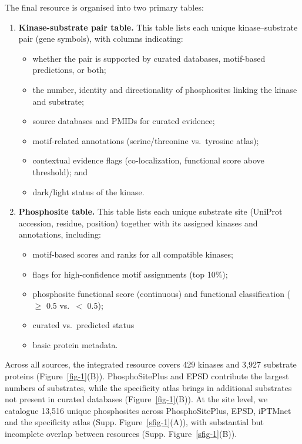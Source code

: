 \documentclass[
  number,
  preprint,
  onecolumn]{elsarticle}
\providecommand{\tightlist}{%
  \setlength{\itemsep}{0pt}\setlength{\parskip}{0pt}}
\begin{document}
The final resource is organised into two primary tables:

\begin{enumerate}
\def\labelenumi{\arabic{enumi}.}
\tightlist
\item
  \textbf{Kinase-substrate pair table.} This table lists each unique
  kinase--substrate pair (gene symbols), with columns indicating:

  \begin{itemize}
  \tightlist
  \item
    whether the pair is supported by curated databases, motif-based
    predictions, or both;
  \item
    the number, identity and directionality of phosphosites linking the
    kinase and substrate;
  \item
    source databases and PMIDs for curated evidence;
  \item
    motif-related annotations (serine/threonine vs.~tyrosine atlas);
  \item
    contextual evidence flags (co-localization, functional score above
    threshold); and
  \item
    dark/light status of the kinase.
  \end{itemize}
\item
  \textbf{Phosphosite table.} This table lists each unique substrate
  site (UniProt accession, residue, position) together with its assigned
  kinases and annotations, including:

  \begin{itemize}
  \tightlist
  \item
    motif-based scores and ranks for all compatible kinases;
  \item
    flags for high-confidence motif assignments (top 10\%);
  \item
    phosphosite functional score (continuous) and functional
    classification (\(\ge\) 0.5 vs.~\(<\) 0.5);
  \item
    curated vs.~predicted status
  \item
    basic protein metadata.
  \end{itemize}
\end{enumerate}

Across all sources, the integrated resource covers 429 kinases and 3,927
substrate proteins (Figure~\ref{fig-1}(B)). PhosphoSitePlus and EPSD
contribute the largest numbers of substrates, while the specificity
atlas brings in additional substrates not present in curated databases
(Figure~\ref{fig-1}(B)). At the site level, we catalogue 13,516 unique
phosphosites across PhosphoSitePlus, EPSD, iPTMnet and the specificity
atlas (Supp. Figure~\ref{sfig-1}(A)), with substantial but incomplete
overlap between resources (Supp. Figure~\ref{sfig-1}(B)).
\end{document}
